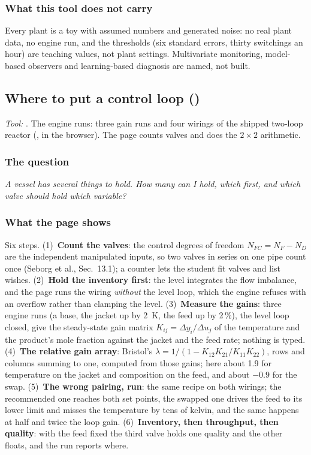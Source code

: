 \documentclass[11pt,a4paper]{article}
\begin{document}
\subsubsection*{What this tool does not carry}

Every plant is a toy with assumed numbers and generated noise: no real plant
data, no engine run, and the thresholds (six standard errors, thirty
switchings an hour) are teaching values, not plant settings.  Multivariate
monitoring, model-based observers and learning-based diagnosis are named, not
built.

\subsection*{Where to put a control loop \quad()}\label{sec:edu-loop-placement}
\textit{\small Tool:} .  The engine runs: three
gain runs and four wirings of the shipped two-loop reactor
 (,
in the browser).  The page counts valves and does the $2\times2$ arithmetic.

\subsubsection*{The question}

\emph{A vessel has several things to hold.  How many can I hold, which first,
and which valve should hold which variable?}

\subsubsection*{What the page shows}

Six steps.  (1)~\textbf{Count the valves}: the control degrees of freedom
$N_{FC}=N_F-N_D$ are the independent manipulated inputs, so two valves in
series on one pipe count once (Seborg et al., Sec.~13.1); a counter lets the
student fit valves and list wishes.  (2)~\textbf{Hold the inventory first}: the
level integrates the flow imbalance, and the page runs the wiring \emph{without}
the level loop, which the engine refuses with an overflow rather than clamping
the level.  (3)~\textbf{Measure the gains}: three engine runs (a base, the
jacket up by 2~K, the feed up by 2\,\%), the level loop closed, give the
steady-state gain matrix $K_{ij}=\Delta y_i/\Delta u_j$ of the temperature and
the product's mole fraction against the jacket and the feed rate; nothing is
typed.  (4)~\textbf{The relative gain array}: Bristol's
$\lambda=1/(1-K_{12}K_{21}/K_{11}K_{22})$, rows and columns summing to one,
computed from those gains; here about 1.9 for temperature on the jacket and
composition on the feed, and about $-0.9$ for the swap.  (5)~\textbf{The wrong
pairing, run}: the same recipe on both wirings; the recommended one reaches both
set points, the swapped one drives the feed to its lower limit and misses the
temperature by tens of kelvin, and the same happens at half and twice the loop
gain.  (6)~\textbf{Inventory, then throughput, then quality}: with the feed
fixed the third valve holds one quality and the other floats, and the run
reports where.
\end{document}
